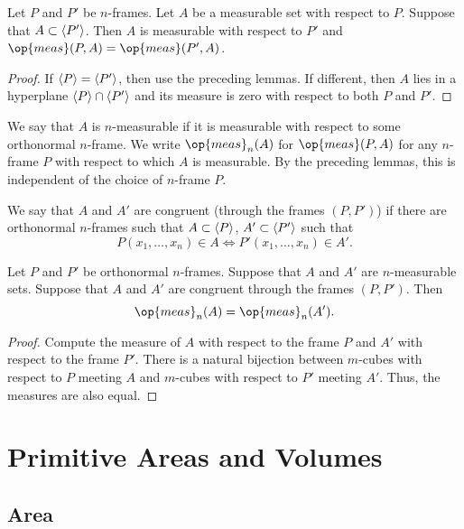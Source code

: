 \begin{lemma}  Let $P$ and $P'$ be $n$-frames.  Let $A$ be a
measurable set with respect to $P$.  Suppose that $A\subset
{\langle P'\rangle}$.  Then $A$ is measurable with respect to $P'$ and
$\op{meas}(P,A) = \op{meas}(P',A)$.
\end{lemma}

\begin{proof}
If ${\langle P\rangle} = {\langle P'\rangle}$, then use the preceding lemmas. If
different, then $A$ lies in a hyperplane ${\langle P\rangle}\cap {\langle P'\rangle}$
and its measure is zero with respect to both $P$ and $P'$.
\end{proof}

\begin{definition}
We say that $A$ is $n$-measurable if it is measurable with respect
to some orthonormal $n$-frame.  We write $\op{meas}_n(A)$ for
$\op{meas}(P,A)$ for any $n$-frame $P$ with respect to which $A$ is
measurable.  By the preceding lemmas, this is independent of the
choice of $n$-frame $P$.
\end{definition}

\begin{definition} We say that $A$ and $A'$ are congruent (through the frames $(P,P')$)
if there are orthonormal $n$-frames such that $A\subset {\langle P\rangle}$,
$A'\subset {\langle P'\rangle}$ such that $$P(x_1,\ldots,x_n) \in A
\Leftrightarrow P'(x_1,\ldots,x_n)\in A'.$$
\end{definition}

\begin{lemma}
Let $P$ and $P'$ be orthonormal $n$-frames.  Suppose that $A$ and
$A'$ are $n$-measurable sets.  Suppose that $A$ and $A'$ are
congruent through the frames $(P,P')$. Then $$\op{meas}_n (A) =
\op{meas}_n (A').$$
\end{lemma}

\begin{proof}
Compute the measure of $A$ with respect to the frame $P$ and $A'$
with respect to the frame $P'$.  There is a natural bijection
between $m$-cubes with respect to $P$ meeting $A$ and $m$-cubes with
respect to $P'$ meeting $A'$.  Thus, the measures are also equal.
\end{proof}



\chapter{Primitive Areas and Volumes}

\section{Area}

